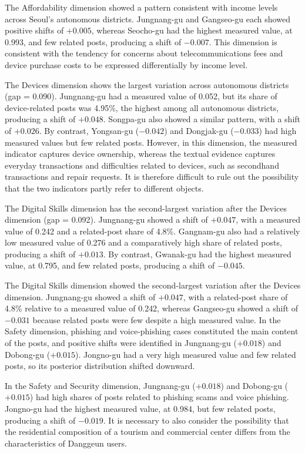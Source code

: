 The Affordability dimension showed a pattern consistent with income levels across Seoul's autonomous districts. Jungnang-gu and Gangseo-gu each showed positive shifts of $+0.005$, whereas Seocho-gu had the highest measured value, at 0.993, and few related posts, producing a shift of $-0.007$. This dimension is consistent with the tendency for concerns about telecommunications fees and device purchase costs to be expressed differentially by income level.

The Devices dimension shows the largest variation across autonomous districts (gap = 0.090). Jungnang-gu had a measured value of 0.052, but its share of device-related posts was 4.95\%, the highest among all autonomous districts, producing a shift of $+0.048$. Songpa-gu also showed a similar pattern, with a shift of $+0.026$. By contrast, Yongsan-gu ($-0.042$) and Dongjak-gu ($-0.033$) had high measured values but few related posts. However, in this dimension, the measured indicator captures device ownership, whereas the textual evidence captures everyday transactions and difficulties related to devices, such as secondhand transactions and repair requests. It is therefore difficult to rule out the possibility that the two indicators partly refer to different objects.

The Digital Skills dimension has the second-largest variation after the Devices dimension (gap = 0.092). Jungnang-gu showed a shift of $+0.047$, with a measured value of 0.242 and a related-post share of 4.8\%. Gangnam-gu also had a relatively low measured value of 0.276 and a comparatively high share of related posts, producing a shift of $+0.013$. By contrast, Gwanak-gu had the highest measured value, at 0.795, and few related posts, producing a shift of $-0.045$.

The Digital Skills dimension showed the second-largest variation after the Devices dimension. Jungnang-gu showed a shift of $+0.047$, with a related-post share of 4.8\% relative to a measured value of 0.242, whereas Gangseo-gu showed a shift of $-0.031$ because related posts were few despite a high measured value. In the Safety dimension, phishing and voice-phishing cases constituted the main content of the posts, and positive shifts were identified in Jungnang-gu ($+0.018$) and Dobong-gu ($+0.015$). Jongno-gu had a very high measured value and few related posts, so its posterior distribution shifted downward.

In the Safety and Security dimension, Jungnang-gu ($+0.018$) and Dobong-gu ($+0.015$) had high shares of posts related to phishing scams and voice phishing. Jongno-gu had the highest measured value, at 0.984, but few related posts, producing a shift of $-0.019$. It is necessary to also consider the possibility that the residential composition of a tourism and commercial center differs from the characteristics of Danggeun users.

